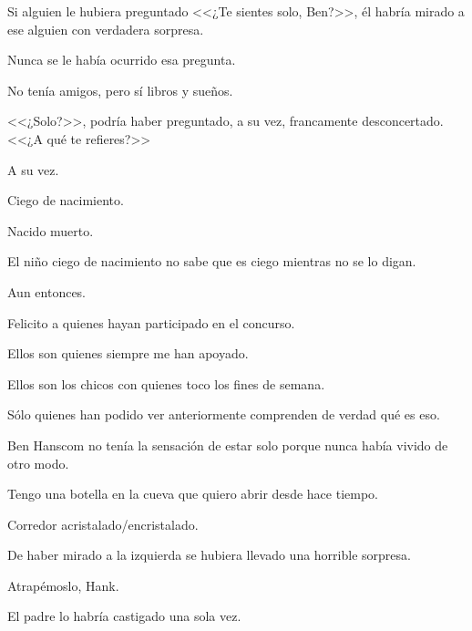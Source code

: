 \sk
Si alguien le hubiera preguntado <<¿Te sientes
solo, Ben?>>, él habría mirado a ese alguien con
verdadera sorpresa. 

\sk
Nunca se le había ocurrido
esa pregunta. 

\sk
No tenía amigos, pero sí libros y
sueños. 

\sk
<<¿Solo?>>, podría haber preguntado, a su vez,
francamente desconcertado. <<¿A qué te refieres?>>

\sk
A su vez. 

\sk
Ciego de nacimiento. 

\sk
Nacido muerto. 

\sk
El niño ciego de nacimiento no sabe que es
ciego mientras no se lo digan.\nb{}

\sk
Aun entonces. 

\sk
Felicito a quienes hayan participado en el concurso. 

\sk
Ellos son quienes siempre me han apoyado. 

\sk
Ellos son los chicos con quienes toco los fines de semana. 

\sk
Sólo quienes han podido ver
anteriormente comprenden de verdad qué es eso.

\sk
Ben Hanscom no tenía la sensación de estar solo
porque nunca había vivido de otro modo.\nb{}

\sk
Tengo una botella en la cueva que quiero abrir desde hace tiempo. 

\sk
Corredor acristalado/encristalado. 

\sk
De haber
mirado a la izquierda se hubiera llevado una
horrible sorpresa. 

\sk
Atrapémoslo, Hank.

\sk
El padre lo habría castigado una sola vez. 

